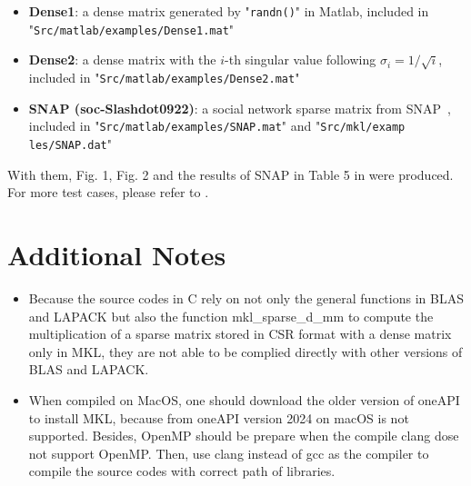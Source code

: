 \documentclass{ol-softwaremanual}
\newcommand{\cmtt}{\fontfamily{cmtt}\selectfont}
\begin{document}
\begin{itemize}
\item \textbf{Dense1}: a dense matrix generated by "\texttt{randn()}" in Matlab, included in "\texttt{Src/matlab/examples/Dense1.mat}"
\item \textbf{Dense2}: a dense matrix with the $i$-th singular value following $\sigma_i = 1/\sqrt{i}$, included in "\texttt{Src/matlab/examples/Dense2.mat}"
\item \textbf{SNAP (soc-Slashdot0922)}: a social network sparse matrix from SNAP~\cite{snapnets}, included in "\texttt{Src/matlab/examples/SNAP.mat}" and "\texttt{Src/mkl/examp\\les/SNAP.dat}"

\end{itemize}

With them, Fig. 1, Fig. 2 and the results of SNAP in Table 5 in \cite{dashSVD} were produced. For more test cases, please refer to \cite{dashSVD}. 

\section{Additional Notes}
\begin{itemize}
\item Because the source codes in C rely on not only the general functions in BLAS and LAPACK but also the function {
\cmtt mkl\_sparse\_d\_mm
} to compute the multiplication of a sparse matrix stored in CSR format with a dense matrix only in MKL, they are not able to be complied directly with other versions of BLAS and LAPACK.
\item When compiled on MacOS, one should download the older version of oneAPI to install MKL, because from oneAPI version 2024 on macOS is not supported. Besides,  OpenMP should be prepare when the compile clang dose not support OpenMP. Then, use clang instead of gcc as the compiler to compile the source codes with correct path of libraries. 
\end{itemize}


	
	
\end{document}
